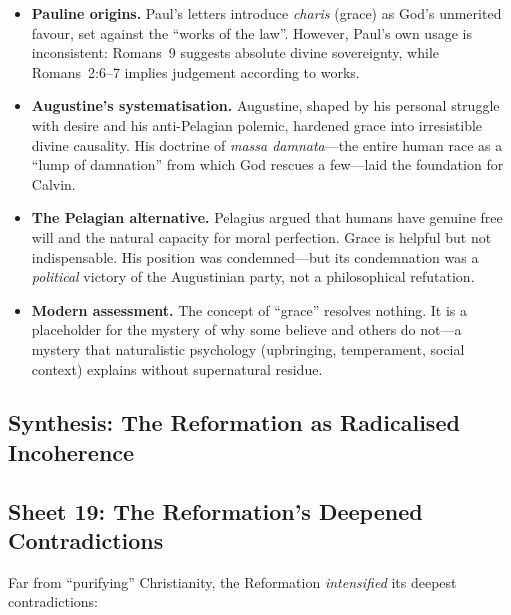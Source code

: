 \begin{itemize}
  \item \textbf{Pauline origins.}
    Paul's letters introduce \textit{charis} (grace) as
    God's unmerited favour, set against the ``works of the
    law''.  However, Paul's own usage is
    inconsistent: Romans~9 suggests absolute divine sovereignty, while
    Romans~2:6--7 implies judgement according to works.

  \item \textbf{Augustine's systematisation.}
    Augustine, shaped by his personal struggle with desire and his
    anti-Pelagian polemic, hardened grace into
    irresistible divine causality.  His doctrine of \textit{massa
    damnata}---the entire human race as a ``lump of
    damnation'' from which God rescues a few---laid the foundation for
    Calvin.

  \item \textbf{The Pelagian alternative.}
    Pelagius argued that humans have genuine free will
    and the natural capacity for moral perfection.  Grace is helpful but
    not indispensable.  His position was condemned---but its condemnation
    was a \emph{political} victory of the Augustinian party, not a
    philosophical refutation.

  \item \textbf{Modern assessment.}
    The concept of ``grace'' resolves nothing.  It is a placeholder for
    the mystery of why some believe and others do not---a mystery that
    naturalistic psychology (upbringing,
    temperament, social context) explains without supernatural residue.
\end{itemize}

\subsection{Synthesis: The Reformation as Radicalised Incoherence}

\subsection{Sheet 19: The Reformation's Deepened Contradictions}

Far from ``purifying'' Christianity, the Reformation \emph{intensified} its
deepest contradictions:

